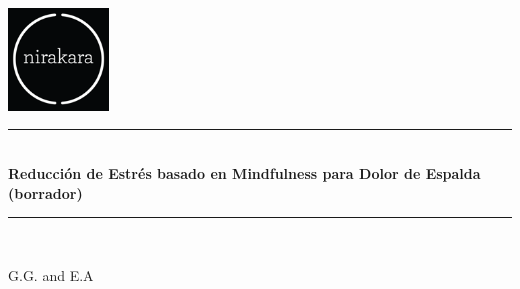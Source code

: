 \begin{titlepage} %
\newcommand{\reglita}{\rule{\linewidth}{0.5mm}}%
\center
\includegraphics[width=0.2\textwidth]{pics/logo.png}\\[1cm] %
\reglita \\[0.4cm]
{ \huge \bfseries Reducción de Estrés basado en Mindfulness para Dolor de Espalda\\
\Large\bfseries (borrador)}\\[0.4cm]
\reglita \\[2.50cm]
\begin{large}
G.G. and E.A
\end{large}\\[0.4cm]
\vfill %
\end{titlepage}